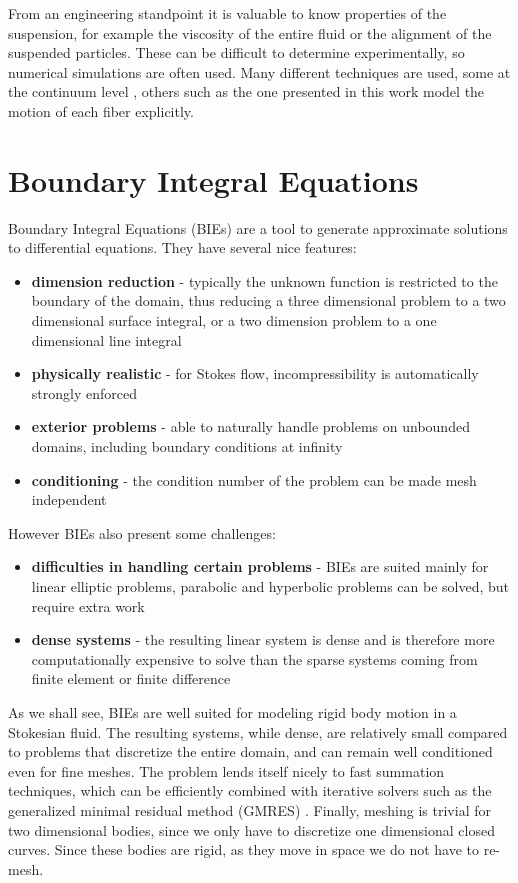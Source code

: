 From an engineering standpoint it is valuable to know properties of the suspension, for example the viscosity of the entire fluid or the alignment of the suspended particles. These can be difficult to determine experimentally, so numerical simulations are often used. Many different techniques are used, some at the continuum level \cite{Folgar1984}, others such as the one presented in this work model the motion of each fiber explicitly. 

\section{Boundary Integral Equations}

Boundary Integral Equations (BIEs) are a tool to generate approximate solutions to differential equations. They have several nice features:
\begin{itemize}
	\item \textbf{dimension reduction} - typically the unknown function is restricted to the boundary of the domain, thus reducing a three dimensional problem to a two dimensional surface integral, or a two dimension problem to a one dimensional line integral
	\item \textbf{physically realistic} - for Stokes flow, incompressibility is automatically strongly enforced
	\item \textbf{exterior problems} - able to naturally handle problems on unbounded domains, including boundary conditions at infinity
	\item \textbf{conditioning} - the condition number of the problem can be made mesh independent
\end{itemize}
However BIEs also present some challenges:
\begin{itemize}
	\item \textbf{difficulties in handling certain problems} - BIEs are suited mainly for linear elliptic problems, parabolic and hyperbolic problems can be solved, but require extra work
	\item \textbf{dense systems} - the resulting linear system is dense and is therefore more computationally expensive to solve than the sparse systems coming from finite element or finite difference
\end{itemize}

As we shall see, BIEs are well suited for modeling rigid body motion in a Stokesian fluid. The resulting systems, while dense, are relatively small compared to problems that discretize the entire domain, and can remain well conditioned even for fine meshes. The problem lends itself nicely to fast summation techniques, which can be efficiently combined with iterative solvers such as the generalized minimal residual method (GMRES) \cite{Saad1986}. Finally, meshing is trivial for two dimensional bodies, since we only have to discretize one dimensional closed curves. Since these bodies are rigid, as they move in space we do not have to re-mesh.

